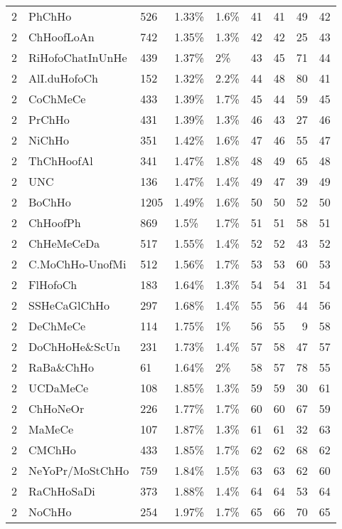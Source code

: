 \begin{longtable}{lllllrrrr}
  2 & PhChHo & 526 & 1.33\% & 1.6\% &  41 &  41 &  49 &  42 \\ 
  2 & ChHoofLoAn & 742 & 1.35\% & 1.3\% &  42 &  42 &  25 &  43 \\ 
  2 & RiHofoChatInUnHe & 439 & 1.37\% & 2\% &  43 &  45 &  71 &  44 \\ 
  2 & AlI.duHofoCh & 152 & 1.32\% & 2.2\% &  44 &  48 &  80 &  41 \\ 
  2 & CoChMeCe & 433 & 1.39\% & 1.7\% &  45 &  44 &  59 &  45 \\ 
  2 & PrChHo & 431 & 1.39\% & 1.3\% &  46 &  43 &  27 &  46 \\ 
  2 & NiChHo & 351 & 1.42\% & 1.6\% &  47 &  46 &  55 &  47 \\ 
  2 & ThChHoofAl & 341 & 1.47\% & 1.8\% &  48 &  49 &  65 &  48 \\ 
  2 & UNC & 136 & 1.47\% & 1.4\% &  49 &  47 &  39 &  49 \\ 
  2 & BoChHo & 1205 & 1.49\% & 1.6\% &  50 &  50 &  52 &  50 \\ 
  2 & ChHoofPh & 869 & 1.5\% & 1.7\% &  51 &  51 &  58 &  51 \\ 
  2 & ChHeMeCeDa & 517 & 1.55\% & 1.4\% &  52 &  52 &  43 &  52 \\ 
  2 & C.MoChHo-UnofMi & 512 & 1.56\% & 1.7\% &  53 &  53 &  60 &  53 \\ 
  2 & FlHofoCh & 183 & 1.64\% & 1.3\% &  54 &  54 &  31 &  54 \\ 
  2 & SSHeCaGlChHo & 297 & 1.68\% & 1.4\% &  55 &  56 &  44 &  56 \\ 
  2 & DeChMeCe & 114 & 1.75\% & 1\% &  56 &  55 &   9 &  58 \\ 
  2 & DoChHoHe\&ScUn & 231 & 1.73\% & 1.4\% &  57 &  58 &  47 &  57 \\ 
  2 & RaBa\&ChHo & 61 & 1.64\% & 2\% &  58 &  57 &  78 &  55 \\ 
  2 & UCDaMeCe & 108 & 1.85\% & 1.3\% &  59 &  59 &  30 &  61 \\ 
  2 & ChHoNeOr & 226 & 1.77\% & 1.7\% &  60 &  60 &  67 &  59 \\ 
  2 & MaMeCe & 107 & 1.87\% & 1.3\% &  61 &  61 &  32 &  63 \\ 
  2 & CMChHo & 433 & 1.85\% & 1.7\% &  62 &  62 &  68 &  62 \\ 
  2 & NeYoPr/MoStChHo & 759 & 1.84\% & 1.5\% &  63 &  63 &  62 &  60 \\ 
  2 & RaChHoSaDi & 373 & 1.88\% & 1.4\% &  64 &  64 &  53 &  64 \\ 
  2 & NoChHo & 254 & 1.97\% & 1.7\% &  65 &  66 &  70 &  65 \\ 

\end{longtable}
